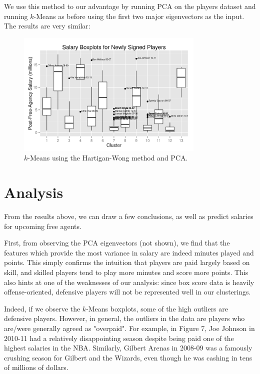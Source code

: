 \documentclass{article}
\begin{document}
We use this method to our advantage by running PCA on the players dataset and running $k$-Means as before using the first two major eigenvectors as the input. The results are very similar:

\begin{figure}[h!]
    \centering
    \includegraphics[width=0.8\textwidth]{hw-kmeans-pca.jpeg}
    \caption{$k$-Means using the Hartigan-Wong method and PCA.}
\end{figure}

\section{Analysis}

From the results above, we can draw a few conclusions, as well as predict salaries for upcoming free agents.

First, from observing the PCA eigenvectors (not shown), we find that the features which provide the most variance in salary are indeed minutes played and points. This simply confirms the intuition that players are paid largely based on skill, and skilled players tend to play more minutes and score more points. This also hints at one of the weaknesses of our analysis: since box score data is heavily offense-oriented, defensive players will not be represented well in our clusterings.

Indeed, if we observe the $k$-Means boxplots, some of the high outliers are defensive players. However, in general, the outliers in the data are players who are/were generally agreed as "overpaid". For example, in Figure 7, Joe Johnson in 2010-11 had a relatively disappointing season despite being paid one of the highest salaries in the NBA. Similarly, Gilbert Arenas in 2008-09 was a famously crushing season for Gilbert and the Wizards, even though he was cashing in tens of millions of dollars.
\end{document}
